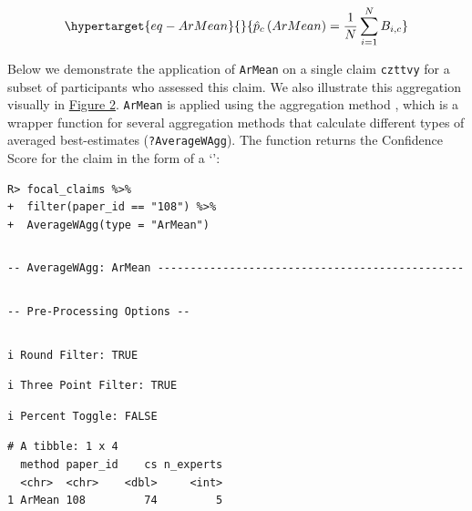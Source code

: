 \documentclass[article]{jss}
\newcommand{\class}[1]{`\code{#1}'}
\newcommand{\fct}[1]{\code{#1()}}
\begin{document}
\begin{equation}\protect\hypertarget{eq-ArMean}{}{
\hat{p}_c\left(ArMean \right ) = \frac{1}{N}\sum_{i=1}^N B_{i,c}
}\label{eq-ArMean}\end{equation}

Below we demonstrate the application of \texttt{ArMean} on a single
claim \texttt{czttvy} for a subset of participants who assessed this
claim. We also illustrate this aggregation visually in
\protect\hyperlink{fig-ArMean}{Figure 2}. \texttt{ArMean} is applied
using the aggregation method \fct{AverageWAgg}, which is a wrapper
function for several aggregation methods that calculate different types
of averaged best-estimates (\texttt{?AverageWAgg}). The function returns
the Confidence Score for the claim in the form of a \class{tibble}:

\begin{verbatim}
R> focal_claims %>% 
+  filter(paper_id == "108") %>%
+  AverageWAgg(type = "ArMean")
\end{verbatim}

\begin{verbatim}
\end{verbatim}

\begin{verbatim}
-- AverageWAgg: ArMean -----------------------------------------------
\end{verbatim}

\begin{verbatim}
\end{verbatim}

\begin{verbatim}
-- Pre-Processing Options --
\end{verbatim}

\begin{verbatim}
\end{verbatim}

\begin{verbatim}
i Round Filter: TRUE
\end{verbatim}

\begin{verbatim}
i Three Point Filter: TRUE
\end{verbatim}

\begin{verbatim}
i Percent Toggle: FALSE
\end{verbatim}

\begin{verbatim}
# A tibble: 1 x 4
  method paper_id    cs n_experts
  <chr>  <chr>    <dbl>     <int>
1 ArMean 108         74         5
\end{verbatim}
\end{document}
